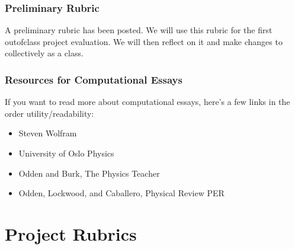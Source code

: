 \documentclass[letterpaper,10pt,english]{jupyterBook}
\begin{document}
\subsubsection{Preliminary Rubric}
\label{\detokenize{content/0_course/3_assessments:preliminary-rubric}}
\sphinxAtStartPar
A preliminary rubric has been posted. We will use this rubric for the first out\sphinxhyphen{}of\sphinxhyphen{}class project evaluation. We will then reflect on it and make changes to collectively as a class.


\subsubsection{Resources for Computational Essays}
\label{\detokenize{content/0_course/3_assessments:resources-for-computational-essays}}
\sphinxAtStartPar
If you want to read more about computational essays, here’s a few links in the order utility/readability:
\begin{itemize}
\item {} 
\sphinxAtStartPar
Steven Wolfram \sphinxhyphen{} 

\item {} 
\sphinxAtStartPar
University of Oslo Physics \sphinxhyphen{} 

\item {} 
\sphinxAtStartPar
Odden and Burk, The Physics Teacher \sphinxhyphen{} 

\item {} 
\sphinxAtStartPar
Odden, Lockwood, and Caballero, Physical Review PER \sphinxhyphen{} 

\end{itemize}

\sphinxstepscope


\section{Project Rubrics}
\label{\detokenize{content/0_course/4_rubric:project-rubrics}}\label{\detokenize{content/0_course/4_rubric::doc}}
\end{document}
